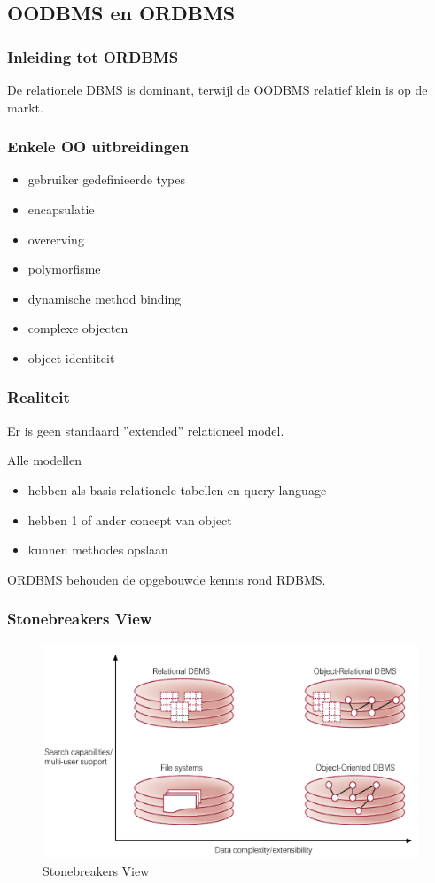 \documentclass[a4paper,12pt]{article}
\begin{document}
\subsection{OODBMS en ORDBMS}
\subsubsection{Inleiding tot ORDBMS}
De relationele DBMS is dominant, terwijl de OODBMS relatief klein is op de markt.

\subsubsection{Enkele OO uitbreidingen}
\begin{itemize}
\item gebruiker gedefinieerde types
\item encapsulatie
\item overerving
\item polymorfisme
\item dynamische method binding
\item complexe objecten
\item object identiteit
\end{itemize}

\subsubsection{Realiteit}
Er is geen standaard ''extended'' relationeel model.

Alle modellen
\begin{itemize}
\item hebben als basis relationele tabellen en query language
\item hebben 1 of ander concept van object
\item kunnen methodes opslaan
\end{itemize}
ORDBMS behouden de opgebouwde kennis rond RDBMS.

\subsubsection{Stonebreakers View}
\begin{figure}[H]
\centering
\includegraphics[width=.7\linewidth]{img/StonebreakersView.png}
\caption{Stonebreakers View}
\label{fig:StonebreakersView}
\end{figure}
\end{document}
